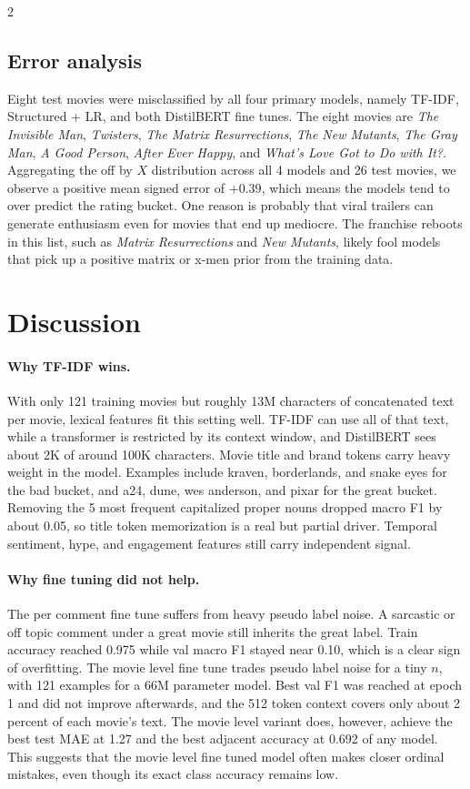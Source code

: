 \documentclass[10pt,letterpaper]{article}
\begin{document}
\begin{multicols}{2}
\subsection{Error analysis}
\noindent Eight test movies were misclassified by all four primary models, namely TF-IDF, Structured + LR, and both DistilBERT fine tunes. The eight movies are \textit{The Invisible Man}, \textit{Twisters}, \textit{The Matrix Resurrections}, \textit{The New Mutants}, \textit{The Gray Man}, \textit{A Good Person}, \textit{After Ever Happy}, and \textit{What's Love Got to Do with It?}. Aggregating the off by $X$ distribution across all 4 models and 26 test movies, we observe a positive mean signed error of $+0.39$, which means the models tend to over predict the rating bucket. One reason is probably that viral trailers can generate enthusiasm even for movies that end up mediocre. The franchise reboots in this list, such as \textit{Matrix Resurrections} and \textit{New Mutants}, likely fool models that pick up a positive matrix or x-men prior from the training data.

\section{Discussion}

\paragraph{Why TF-IDF wins.} With only 121 training movies but roughly 13M characters of concatenated text per movie, lexical features fit this setting well. TF-IDF can use all of that text, while a transformer is restricted by its context window, and DistilBERT sees about 2K of around 100K characters. Movie title and brand tokens carry heavy weight in the model. Examples include kraven, borderlands, and snake eyes for the bad bucket, and a24, dune, wes anderson, and pixar for the great bucket. Removing the 5 most frequent capitalized proper nouns dropped macro F1 by about 0.05, so title token memorization is a real but partial driver. Temporal sentiment, hype, and engagement features still carry independent signal.

\paragraph{Why fine tuning did not help.} The per comment fine tune suffers from heavy pseudo label noise. A sarcastic or off topic comment under a great movie still inherits the great label. Train accuracy reached 0.975 while val macro F1 stayed near 0.10, which is a clear sign of overfitting. The movie level fine tune trades pseudo label noise for a tiny $n$, with 121 examples for a 66M parameter model. Best val F1 was reached at epoch 1 and did not improve afterwards, and the 512 token context covers only about 2 percent of each movie's text. The movie level variant does, however, achieve the best test MAE at 1.27 and the best adjacent accuracy at 0.692 of any model. This suggests that the movie level fine tuned model often makes closer ordinal mistakes, even though its exact class accuracy remains low.


\end{multicols}
\end{document}
